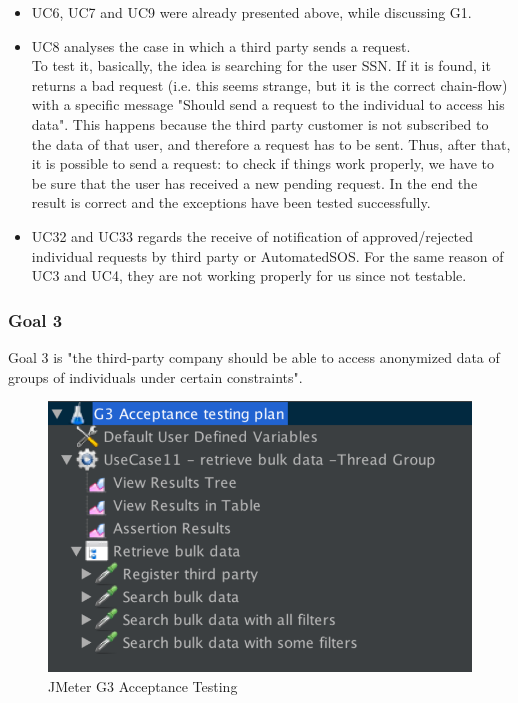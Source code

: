 \begin{itemize}
\item UC6, UC7 and UC9 were already presented above, while discussing G1.

\item UC8 analyses the case in which a third party sends a request. \\
To test it, basically, the idea is searching for the user SSN. 
If it is found, it returns a bad request (i.e. this seems strange, but it is the correct chain-flow) with a specific message "Should send a
request to the individual to access his data". This happens because the third party customer is not subscribed to the data of that user, and
therefore a request has to be sent.
Thus, after that, it is possible to send a request: to check if things work properly, we have to be sure that the user has received a new pending request. In the end  the result is correct and the exceptions have been tested successfully. 

\item UC32 and UC33 regards the receive of notification of approved/rejected individual requests by third party or AutomatedSOS. For the same reason of UC3 and UC4, they are not working properly for us since not testable.

\end{itemize}

\subsubsection{Goal 3}
Goal 3 is "the third-party company should be able to access anonymized data of groups
of individuals under certain constraints".

\begin{figure}[H]
\includegraphics[width=0.7\linewidth]{images/goal3}
\centering
\caption{ JMeter G3 Acceptance Testing }
\label{fig:goal3}
\end{figure}

